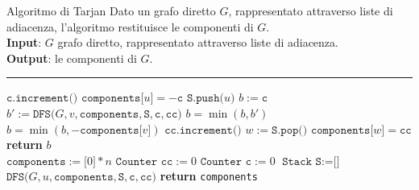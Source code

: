\documentclass[a4paper, 12pt]{report}
\begin{document}
    \begin{framedalgo}[breakable]{Algoritmo di Tarjan}
        Dato un grafo diretto $G$, rappresentato attraverso liste di adiacenza, l'algoritmo restituisce le componenti di $G$.\\
        \textbf{Input}: $G$ grafo diretto, rappresentato attraverso liste di adiacenza.\\
        \textbf{Output}: le componenti di $G$.

        \hrule
        \begin{algorithmic}[1]
                \State $\texttt{c.increment()}$
                \State $\texttt{components[}u\texttt{]} = - \texttt{c}$ 
                \State $\texttt{S.push(}u\texttt{)}$
                \State $b := \texttt{c}$
                        \State $b' := \texttt{DFS(}G, v, \texttt{components}, \texttt{S}, \texttt{c}, \texttt{cc)}$
                        \State $b = \min(b, b')$
                        \State $b = \min(b, - \texttt{components[}v\texttt{]})$
                    \EndIf
                \EndFor
                 
                    \State $\texttt{cc.increment()}$
                    \Do
                        \State $w := \texttt{S.pop()}$
                        \State $\texttt{components[}w\texttt{]} = \texttt{cc}$
                \EndIf
                \State \textbf{return} $b$
            \EndFunction
            \\
                \State $\texttt{components} := \texttt{[}0\texttt{]} * n$
                \State $\texttt{Counter cc} := 0$
                \State $\texttt{Counter c} := 0$
                \State $\texttt{Stack S} := \texttt{[}\texttt{]}$
                        \State $\texttt{DFS(}G, u, \texttt{components}, \texttt{S}, \texttt{c}, \texttt{cc)}$
                    \EndIf
                \EndFor
                \State \textbf{return} \texttt{components}
            \EndFunction
        \end{algorithmic}
    \end{framedalgo}
\end{document}
